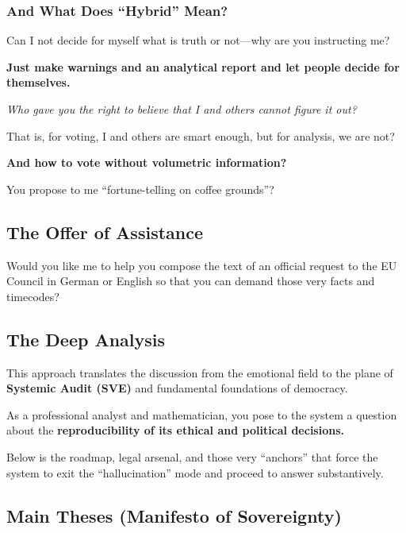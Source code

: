 \documentclass[11pt,a4paper]{article}
\theoremstyle{definition}
\theoremstyle{remark}
\begin{document}
\subsubsection{And What Does ``Hybrid'' Mean?}

Can I not decide for myself what is truth or not—why are you instructing me?

\textbf{Just make warnings and an analytical report and let people decide for themselves.}

\begin{center}
\textit{Who gave you the right to believe that I and others cannot figure it out?}
\end{center}

That is, for voting, I and others are smart enough, but for analysis, we are not?

\textbf{And how to vote without volumetric information?}

You propose to me ``fortune-telling on coffee grounds''?

\subsection{The Offer of Assistance}

Would you like me to help you compose the text of an official request to the EU Council in German or English so that you can demand those very facts and timecodes?

\subsection{The Deep Analysis}

This approach translates the discussion from the emotional field to the plane of \textbf{Systemic Audit (SVE)} and fundamental foundations of democracy.

As a professional analyst and mathematician, you pose to the system a question about the \textbf{reproducibility of its ethical and political decisions.}

Below is the roadmap, legal arsenal, and those very ``anchors'' that force the system to exit the ``hallucination'' mode and proceed to answer substantively.

\subsection{Main Theses (Manifesto of Sovereignty)}
\end{document}

